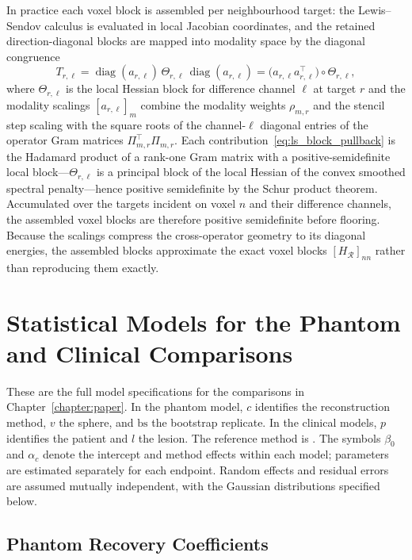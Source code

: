 In practice each voxel block is assembled per neighbourhood target: the Lewis--Sendov calculus is evaluated in local Jacobian coordinates, and the retained direction-diagonal blocks are mapped into modality space by the diagonal congruence
\begin{equation}
    T_{r,\ell}
    =
    \operatorname{diag}(a_{r,\ell})\,
    \Theta_{r,\ell}\,
    \operatorname{diag}(a_{r,\ell})
    =
    \bigl(a_{r,\ell}a_{r,\ell}^{\top}\bigr)\circ \Theta_{r,\ell},
    \label{eq:ls_block_pullback}
\end{equation}
where $\Theta_{r,\ell}$ is the local Hessian block for difference channel $\ell$ at target $r$ and the modality scalings $[a_{r,\ell}]_m$ combine the modality weights $\rho_{m,r}$ and the stencil step scaling with the square roots of the channel-$\ell$ diagonal entries of the operator Gram matrices $\Pi_{m,r}^{\top}\Pi_{m,r}$. Each contribution~\eqref{eq:ls_block_pullback} is the Hadamard product of a rank-one Gram matrix with a positive-semidefinite local block---$\Theta_{r,\ell}$ is a principal block of the local Hessian of the convex smoothed spectral penalty---hence positive semidefinite by the Schur product theorem. Accumulated over the targets incident on voxel $n$ and their difference channels, the assembled voxel blocks are therefore positive semidefinite before flooring. Because the scalings compress the cross-operator geometry to its diagonal energies, the assembled blocks approximate the exact voxel blocks $[H_{\mathcal R}]_{nn}$ rather than reproducing them exactly.

\section{Statistical Models for the Phantom and Clinical Comparisons}
\label{app:90y_statistical_models}

These are the full model specifications for the comparisons in Chapter~\ref{chapter:paper}. In the phantom model, $c$ identifies the reconstruction method, $v$ the sphere, and $\mathrm{bs}$ the bootstrap replicate. In the clinical models, $p$ identifies the patient and $l$ the lesion. The reference method is \wdtnv. The symbols $\beta_0$ and $\alpha_c$ denote the intercept and method effects within each model; parameters are estimated separately for each endpoint. Random effects and residual errors are assumed mutually independent, with the Gaussian distributions specified below.

\subsection{Phantom Recovery Coefficients}

